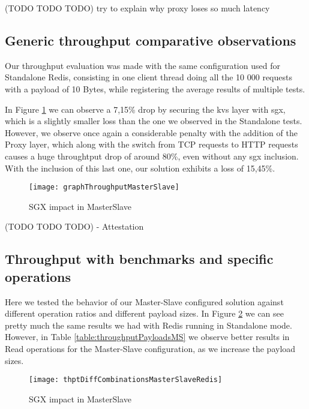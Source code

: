 (TODO TODO TODO) try to explain why proxy loses so much latency

\subsection{Generic throughput comparative observations}
Our throughput evaluation was made with the same configuration used for Standalone Redis, consisting in one client thread doing all the 10 000 requests with a payload of 10 Bytes, while registering the average results of multiple tests.

In Figure \ref{fig:graphTroughputMasterSlave} we can observe a 7,15\% drop by securing the \gls{kvs} layer with \gls{sgx}, which is a slightly smaller loss than the one we observed in the Standalone tests. However, we observe once again a considerable penalty with the addition of the Proxy layer, which along with the switch from TCP requests to HTTP requests causes a huge throughtput drop of around 80\%, even without any \gls{sgx} inclusion. With the inclusion of this last one, our solution exhibits a loss of 15,45\%.

\begin{figure}[htbp]
	\centering
	{\texttt{[image: graphThroughputMasterSlave]}}
	\caption{SGX impact in MasterSlave}
	\label{fig:graphTroughputMasterSlave}
\end{figure}

(TODO TODO TODO) - Attestation

\subsection{Throughput with benchmarks and specific operations}

Here we tested the behavior of our Master-Slave configured solution against different operation ratios and different payload sizes. 
In Figure \ref{fig:thptDiffCombinationsMasterSlaveRedis} we can see pretty much the same results we had with Redis running in Standalone mode. However, in Table \ref{table:throughputPayloadsMS} we observe better results in Read operations for the Master-Slave configuration, as we increase the payload sizes. 

\begin{figure}[htbp]
	\centering
	{\texttt{[image: thptDiffCombinationsMasterSlaveRedis]}}
	\caption{SGX impact in MasterSlave}
	\label{fig:thptDiffCombinationsMasterSlaveRedis}
\end{figure}

